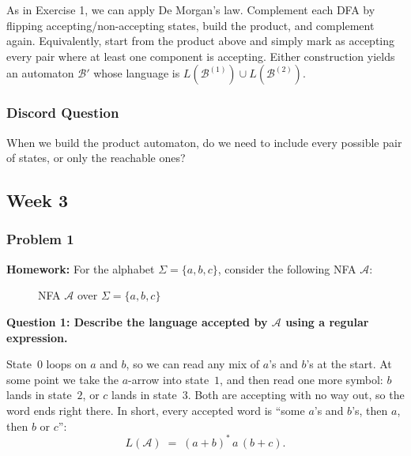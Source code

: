 \documentclass{article}
\theoremstyle{theorem}
\theoremstyle{definition}
\theoremstyle{remark}
\begin{document}
As in Exercise 1, we can apply De Morgan's law. Complement each DFA by flipping accepting/non-accepting states, build the product, and complement again. Equivalently, start from the product above and simply mark as accepting every pair where at least one component is accepting. Either construction yields an automaton $\mathcal{B}'$ whose language is $L(\mathcal{B}^{(1)}) \cup L(\mathcal{B}^{(2)})$.

\subsubsection{Discord Question}

When we build the product automaton, do we need to include every possible pair of states, or only the reachable ones?

\subsection{Week 3}

\subsubsection{Problem 1}

\textbf{Homework:} For the alphabet $\Sigma = \{a, b, c\}$, consider the following NFA $\mathcal{A}$:

\begin{figure}[H]
  \centering
  \caption{NFA $\mathcal{A}$ over $\Sigma = \{a,b,c\}$}
\end{figure}

\textbf{Question 1: Describe the language accepted by $\mathcal{A}$ using a regular expression.}

State~$0$ loops on $a$ and $b$, so we can read any mix of $a$'s and $b$'s at the start. At some point we take the $a$-arrow into state~$1$, and then read one more symbol: $b$ lands in state~$2$, or $c$ lands in state~$3$. Both are accepting with no way out, so the word ends right there. In short, every accepted word is ``some $a$'s and $b$'s, then $a$, then $b$ or $c$'':
\[
  L(\mathcal{A}) \;=\; (a+b)^{*}\,a\,(b+c).
\]
\end{document}

